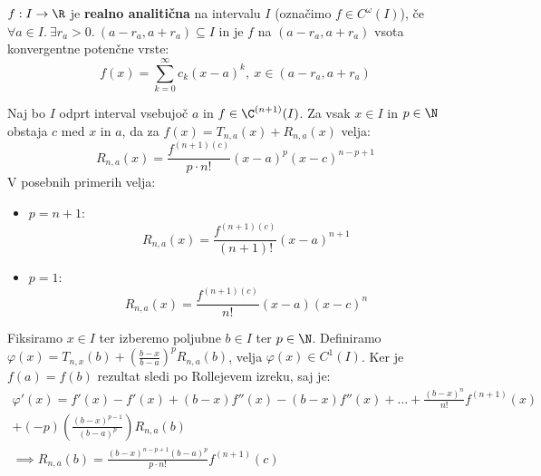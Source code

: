 \documentclass[12pt, a4paper, unicode]{article}
\begin{document}
\begin{definicija}
$f: I \to \R$ je \textbf{realno analitična} na intervalu $I$ (označimo $f \in C^{\omega}(I)$), če $\forall a \in I. \: \exists r_a > 0. \: (a-r_a, a+r_a) \subseteq I$ in je $f$ na $(a-r_a,a+r_a)$ vsota konvergentne potenčne vrste:
\[
f(x) = \sum_{k=0}^{\infty} c_k (x-a)^k , \: x \in (a-r_a,a+r_a)
\]
\end{definicija}

\begin{izrek}
Naj bo $I$ odprt interval vsebujoč $a$ in $f \in \C^{(n+1)}(I)$. Za vsak $x \in I$ in $p \in \N$ obstaja $c$ med $x$ in $a$, da za $f(x) = T_{n,a}(x) + R_{n,a}(x)$ velja:
\[
R_{n,a}(x) = \frac{f^{(n+1)(c)}}{p \cdot n!}(x-a)^p(x-c)^{n-p+1}
\]
V posebnih primerih velja:
\begin{itemize}
    \item $p=n+1$: $$ R_{n,a}(x) = \frac{f^{(n+1)(c)}}{(n+1)!}(x-a)^{n+1}$$
    \item $p=1$: $$R_{n,a}(x) = \frac{f^{(n+1)(c)}}{n!} (x-a)(x-c)^n$$
\end{itemize}
\end{izrek}
\begin{oris}
Fiksiramo $x \in I$ ter izberemo poljubne $b \in I$ ter $p \in \N$. Definiramo $\varphi(x) = T_{n,x}(b) + \left(\frac{b-x}{b-a}\right)^p R_{n,a}(b)$, velja $\varphi(x) \in C^1(I)$. Ker je $f(a) = f(b)$ rezultat sledi po Rollejevem izreku, saj je:
\begin{multline*}
\varphi'(x) = f'(x) - f'(x) + (b-x)f''(x) - (b-x)f''(x) + \dots + \frac{(b-x)^n}{n!}f^{(n+1)}(x) \\
+ (-p) \left(\frac{(b-x)^{p-1}}{(b-a)^{p}}\right) R_{n,a}(b)\\
\implies R_{n,a}(b) = \frac{(b-x)^{n-p+1} (b-a)^p}{p \cdot n!} f^{(n+1)}(c)
\end{multline*}
\end{oris}
\end{document}

